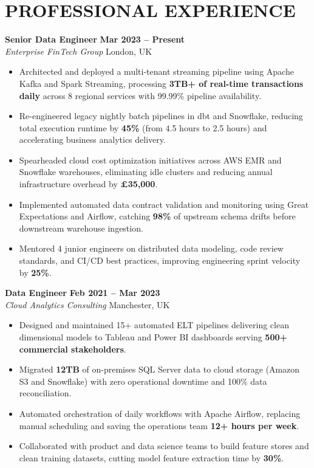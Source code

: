 \documentclass[11pt,a4paper]{article}
\begin{document}
\section*{PROFESSIONAL EXPERIENCE}

\textbf{Senior Data Engineer} \hfill \textbf{Mar 2023 -- Present} \\
\textit{Enterprise FinTech Group} \hfill London, UK
\begin{itemize}
    \item Architected and deployed a multi-tenant streaming pipeline using Apache Kafka and Spark Streaming, processing \textbf{3TB+ of real-time transactions daily} across 8 regional services with 99.99\% pipeline availability.
    \item Re-engineered legacy nightly batch pipelines in dbt and Snowflake, reducing total execution runtime by \textbf{45\%} (from 4.5 hours to 2.5 hours) and accelerating business analytics delivery.
    \item Spearheaded cloud cost optimization initiatives across AWS EMR and Snowflake warehouses, eliminating idle clusters and reducing annual infrastructure overhead by \textbf{\pounds35,000}.
    \item Implemented automated data contract validation and monitoring using Great Expectations and Airflow, catching \textbf{98\%} of upstream schema drifts before downstream warehouse ingestion.
    \item Mentored 4 junior engineers on distributed data modeling, code review standards, and CI/CD best practices, improving engineering sprint velocity by \textbf{25\%}.
\end{itemize}
\vspace{8pt}

\textbf{Data Engineer} \hfill \textbf{Feb 2021 -- Mar 2023} \\
\textit{Cloud Analytics Consulting} \hfill Manchester, UK
\begin{itemize}
    \item Designed and maintained 15+ automated ELT pipelines delivering clean dimensional models to Tableau and Power BI dashboards serving \textbf{500+ commercial stakeholders}.
    \item Migrated \textbf{12TB} of on-premises SQL Server data to cloud storage (Amazon S3 and Snowflake) with zero operational downtime and 100\% data reconciliation.
    \item Automated orchestration of daily workflows with Apache Airflow, replacing manual scheduling and saving the operations team \textbf{12+ hours per week}.
    \item Collaborated with product and data science teams to build feature stores and clean training datasets, cutting model feature extraction time by \textbf{30\%}.
\end{itemize}
\end{document}
